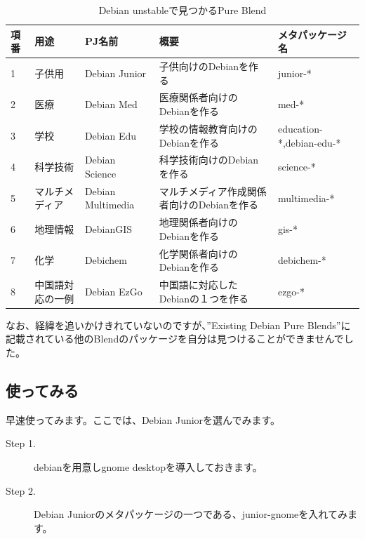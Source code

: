 \documentclass[mingoth,a4paper]{jsarticle}
\begin{document}
\begin{table}[ht]
\begin{center}
\begin{tabular}{|l|l|l|p{5cm}|l|}
\hline 
項番&用途& PJ名前 & 概要&メタパッケージ名 \\ \hline \hline
1 & 子供用 & Debian Junior & 子供向けのDebianを作る & junior-* \\ \hline 
2 & 医療 & Debian Med  & 医療関係者向けのDebianを作る & med-* \\ \hline 
3 & 学校 & Debian Edu & 学校の情報教育向けのDebianを作る & education-*,debian-edu-* \\ \hline 
4 & 科学技術 & Debian Science & 科学技術向けのDebianを作る & science-* \\ \hline 
5 & マルチメディア & Debian Multimedia & マルチメディア作成関係者向けのDebianを作る & multimedia-* \\ \hline 
6 & 地理情報 & DebianGIS & 地理関係者向けのDebianを作る & gis-* \\ \hline 
7 & 化学 & Debichem & 化学関係者向けのDebianを作る & debichem-* \\ \hline 
8 & 中国語対応の一例 & Debian EzGo & 中国語に対応したDebianの１つを作る & ezgo-* \\ \hline 
\end{tabular}
\label{tab:debian-blend-package}
\caption{Debian unstableで見つかるPure Blend}
\end{center}
\end{table}

 なお、経緯を追いかけきれていないのですが、''Existing Debian Pure Blends''に記載されている他のBlendのパッケージ\cite{debian-existing-blends}を自分は見つけることができませんでした。

\subsection{使ってみる}

 早速使ってみます。ここでは、Debian Juniorを選んでみます。

\begin{description}
\item [Step 1.] debianを用意しgnome desktopを導入しておきます。
\item [Step 2.] Debian Juniorのメタパッケージの一つである、junior-gnomeを入れてみます。
\end{description}
\end{document}
